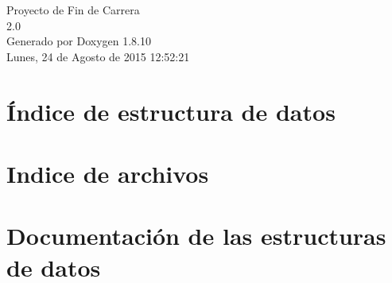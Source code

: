 \documentclass[twoside]{book}
\newcommand{\+}{\discretionary{\mbox{\scriptsize$\hookleftarrow$}}{}{}}
\newcommand{\clearemptydoublepage}{%
  \newpage{\pagestyle{empty}\cleardoublepage}%
}
\begin{document}
\hypersetup{pageanchor=false,
             bookmarks=true,
             bookmarksnumbered=true,
             pdfencoding=unicode
            }
\begin{titlepage}
\vspace*{7cm}
\begin{center}%
{\Large Proyecto de Fin de Carrera \\[1ex]\large 2.\+0 }\\
\vspace*{1cm}
{\large Generado por Doxygen 1.8.10}\\
\vspace*{0.5cm}
{\small Lunes, 24 de Agosto de 2015 12:52:21}\\
\end{center}
\end{titlepage}
\clearemptydoublepage
\tableofcontents
\clearemptydoublepage
{}
\hypersetup{pageanchor=true}

\chapter{Índice de estructura de datos}

\chapter{Indice de archivos}

\chapter{Documentación de las estructuras de datos}

















































\end{document}
